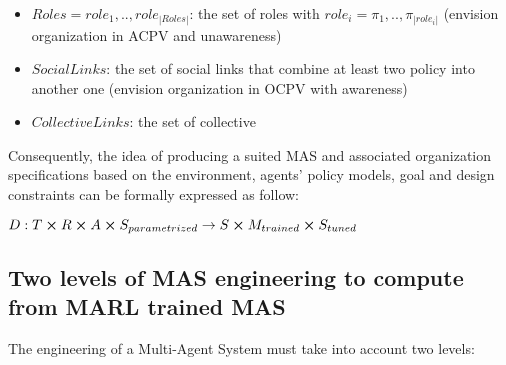 \documentclass[runningheads]{llncs}
\begin{document}
\begin{itemize}
    \item $Roles = {role_1,..,role_{|Roles|}}$: the set of roles with $role_i = {\pi_1,..,\pi_{|role_i|}}$ (envision organization in ACPV and unawareness)
    \item $SocialLinks$: the set of social links that combine at least two policy into another one (envision organization in OCPV with awareness)
    \item $CollectiveLinks$: the set of collective
\end{itemize}


Consequently, the idea of producing a suited MAS and associated organization specifications based on the environment, agents' policy models, goal and design constraints can be formally expressed as follow:


$D: T \cross R \cross A \cross S_{parametrized} \rightarrow S \cross M_{trained} \cross S_{tuned}$


\subsection{Two levels of MAS engineering to compute from MARL trained MAS}

The engineering of a Multi-Agent System must take into account two levels:
\end{document}
